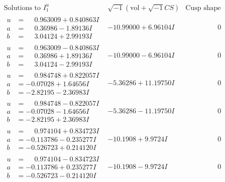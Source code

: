 \documentclass[1p]{elsarticle_modified}
\theoremstyle{definition}
\newcommand{\I}{\sqrt{-1}}
\begin{document}
$$\begin{array}{c|c|c}
 \end{array}$$\newpage$$\begin{array}{c|c|c}  
\text{Solutions to }I^u_{1}& \I (\text{vol} + \sqrt{-1}CS) & \text{Cusp shape}\\
 \hline 
\begin{aligned}
u &= \phantom{-}0.963009 + 0.840863 I \\
a &= \phantom{-}0.36986 - 1.89136 I \\
b &= \phantom{-}3.04124 + 2.99193 I\end{aligned}
 & -10.99000 + 6.96104 I & \phantom{-0.000000 } 0 \\ \hline\begin{aligned}
u &= \phantom{-}0.963009 - 0.840863 I \\
a &= \phantom{-}0.36986 + 1.89136 I \\
b &= \phantom{-}3.04124 - 2.99193 I\end{aligned}
 & -10.99000 - 6.96104 I & \phantom{-0.000000 } 0 \\ \hline\begin{aligned}
u &= \phantom{-}0.984748 + 0.822057 I \\
a &= -0.07028 + 1.64656 I \\
b &= -2.82195 - 2.36983 I\end{aligned}
 & -5.36286 + 11.19750 I & \phantom{-0.000000 } 0 \\ \hline\begin{aligned}
u &= \phantom{-}0.984748 - 0.822057 I \\
a &= -0.07028 - 1.64656 I \\
b &= -2.82195 + 2.36983 I\end{aligned}
 & -5.36286 - 11.19750 I & \phantom{-0.000000 } 0 \\ \hline\begin{aligned}
u &= \phantom{-}0.974104 + 0.834723 I \\
a &= -0.113786 - 0.235277 I \\
b &= -0.526723 + 0.214120 I\end{aligned}
 & -10.1908 + 9.9724 I & \phantom{-0.000000 } 0 \\ \hline\begin{aligned}
u &= \phantom{-}0.974104 - 0.834723 I \\
a &= -0.113786 + 0.235277 I \\
b &= -0.526723 - 0.214120 I\end{aligned}
 & -10.1908 - 9.9724 I & \phantom{-0.000000 } 0 \\ \hline\begin{aligned}

\end{aligned}
\end{array}$$
\end{document}
